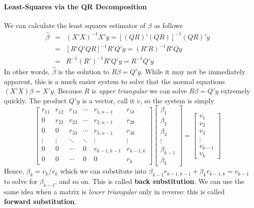 \paragraph{Least-Squares via the QR Decomposition} We can calculate the least squares estimator of $\beta$ as follows
\begin{eqnarray*}
  \widehat{\beta} &=& (X'X)^{-1} X'y = \left[(QR)' (QR) \right]^{-1} (QR)' y\\
    &=&\left[ R' Q' Q R\right]^{-1} R'Q' y = (R'R)^{-1} R'Q y\\
    &=& R^{-1} (R')^{-1} R' Q'y = R^{-1} Q'y
\end{eqnarray*}
In other words, $\widehat{\beta}$ is the solution to $R\beta = Q'y$.
While it may not be immediately apparent, this is a much easier system to solve that the normal equations $(X'X) \beta = X'y$.
Because $R$ is \emph{upper triangular} we can solve $R\beta = Q'y$ extremely quickly.
The product $Q'y$ is a vector, call it $v$, so the system is simply
  $$\left[
    \begin{array}
      {cccccc}
      r_{11} & r_{12}  & r_{13}& \cdots & r_{1,n-1} & r_{1k} \\
      0 & r_{22} & r_{23}&\cdots & r_{2,n-1} & r_{2k}\\
      0&  0 &  r_{33}& \cdots & r_{3,n-1} & r_{3k}\\  
      \vdots & \vdots & \ddots& \ddots & \vdots & \vdots\\
      0 & 0 & \cdots &0  & r_{k-1, k-1} & r_{k-1, k} \\
      0 & 0 & \cdots & 0 & 0 & r_{k}
    \end{array}
  \right] \left[ \begin{array}
    {ccc}
    \beta_1 \\ \beta_2 \\ \beta_3 \\ \vdots \\ \beta_{k-1} \\ \beta_k
  \end{array}\right] = \left[ \begin{array}
    {c}
    v_1  \\ v_2  \\ v_3 \\  \vdots \\ v_{k-1} \\ v_{k}
  \end{array}\right]
  $$
Hence, $\beta_k = v_k / r_k$ which we can substitute into $\beta_{k-1} r_{k-1,k-1} + \beta_k r_{k-1,k} = v_{k-1}$ to solve for $\beta_{k-1}$, and so on.
This is called \textbf{back substitution}.
We can use the same idea when a matrix is \emph{lower triangular} only in reverse: this is called \textbf{forward substitution}.


